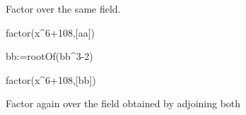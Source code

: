 {{{{{{{{{{{\begin{xtc}
\end{xtc}
\begin{xtc}
\begin{xtccomment}
Factor  over the same field.
\end{xtccomment}
\begin{spadsrc}
factor(x^6+108,[aa]) 
\end{spadsrc}
\begin{TeXOutput}
\begin{fricasmath}{6}
\TIMES {}%
\end{fricasmath}
\end{TeXOutput}
\end{xtc}
\begin{xtc}
\begin{xtccomment}
\end{xtccomment}
\begin{spadsrc}
bb:=rootOf(bb^3-2) 
\end{spadsrc}
\begin{TeXOutput}
\begin{fricasmath}{7}
%
\end{fricasmath}
\end{TeXOutput}
\end{xtc}
\begin{xtc}
\begin{xtccomment}
\end{xtccomment}
\begin{spadsrc}
factor(x^6+108,[bb]) 
\end{spadsrc}
\begin{TeXOutput}
\begin{fricasmath}{8}
\TIMES {}\TIMES {}%
\end{fricasmath}
\end{TeXOutput}
\end{xtc}
\begin{xtc}
\begin{xtccomment}
Factor again over the field obtained by adjoining both 

\end{xtccomment}
\end{xtc}}}}}}}}}}}}

